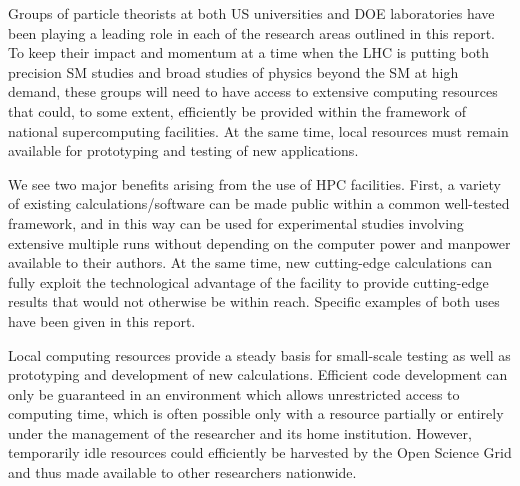\documentclass[12pt]{article}
\begin{document}
Groups of particle theorists at both US universities and DOE
laboratories have been playing a leading role in each of the research
areas outlined in this report. To keep their impact and momentum at a time 
when the LHC is putting both precision SM studies and broad studies
of physics beyond the SM at high demand, these groups will need to have
access to extensive computing resources that could, to some extent, efficiently 
be provided within the framework of national supercomputing facilities.
At the same time, local resources must remain available for prototyping 
and testing of new applications.

We see two major benefits arising from the use of HPC facilities.  
First, a variety of existing
calculations/software can be made public within a common well-tested
framework, and in this way can be used for experimental studies
involving extensive multiple runs without depending on the computer
power and manpower available to their authors.  At the same time, new
cutting-edge calculations can fully exploit the technological advantage
of the facility to provide cutting-edge results that would not otherwise 
be within reach. Specific examples of both uses have been given in this report.

Local computing resources provide a steady basis for small-scale
testing as well as prototyping and development of new calculations.
Efficient code development can only be guaranteed in an environment 
which allows unrestricted access to computing time, which is often
possible only with a resource partially or entirely under the management
of the researcher and its home institution. However, temporarily idle 
resources could efficiently be harvested by the Open Science Grid 
and thus made available to other researchers nationwide.

\clearpage

  

\end{document}
